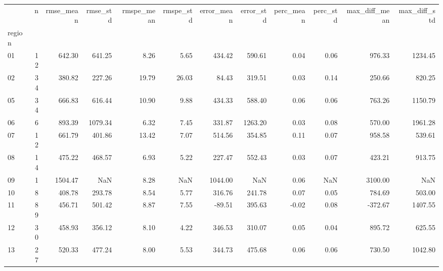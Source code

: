\begin{tabular}{lrrrrrrrrrrr}
\toprule
{} &   n &  rmse\_mean &  rmse\_std &  rmspe\_mean &  rmspe\_std &  error\_mean &  error\_std &  perc\_mean &  perc\_std &  max\_diff\_mean &  max\_diff\_std \\
region &     &            &           &             &            &             &            &            &           &                &               \\
\midrule
01     &  12 &     642.30 &    641.25 &        8.26 &       5.65 &      434.42 &     590.61 &       0.04 &      0.06 &         976.33 &       1234.45 \\
02     &  34 &     380.82 &    227.26 &       19.79 &      26.03 &       84.43 &     319.51 &       0.03 &      0.14 &         250.66 &        820.25 \\
05     &  34 &     666.83 &    616.44 &       10.90 &       9.88 &      434.33 &     588.40 &       0.06 &      0.06 &         763.26 &       1150.79 \\
06     &   6 &     893.39 &   1079.34 &        6.32 &       7.45 &      331.87 &    1263.20 &       0.03 &      0.08 &         570.00 &       1961.28 \\
07     &  12 &     661.79 &    401.86 &       13.42 &       7.07 &      514.56 &     354.85 &       0.11 &      0.07 &         958.58 &        539.61 \\
08     &  14 &     475.22 &    468.57 &        6.93 &       5.22 &      227.47 &     552.43 &       0.03 &      0.07 &         423.21 &        913.75 \\
09     &   1 &    1504.47 &       NaN &        8.28 &        NaN &     1044.00 &        NaN &       0.06 &       NaN &        3100.00 &           NaN \\
10     &   8 &     408.78 &    293.78 &        8.54 &       5.77 &      316.76 &     241.78 &       0.07 &      0.05 &         784.69 &        503.00 \\
11     &  89 &     456.71 &    501.42 &        8.87 &       7.55 &      -89.51 &     395.63 &      -0.02 &      0.08 &        -372.67 &       1407.55 \\
12     &  30 &     458.93 &    356.12 &        8.10 &       4.22 &      346.53 &     310.07 &       0.05 &      0.04 &         895.72 &        625.55 \\
13     &  27 &     520.33 &    477.24 &        8.00 &       5.53 &      344.73 &     475.68 &       0.06 &      0.06 &         730.50 &       1042.80 \\

\end{tabular}
